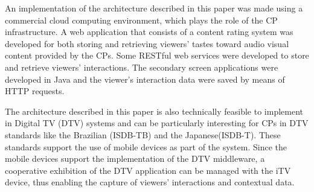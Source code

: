 \documentclass[conference,a4paper]{IEEEtran}
\begin{document}
An implementation of the architecture described in this paper was made using a commercial cloud computing environment, which plays the role of the CP infrastructure. A web application that consists of a content rating system was developed for both storing and retrieving viewers' tastes toward audio visual content provided by the CPs. Some RESTful web services were developed to store and retrieve viewers' interactions. The secondary screen applications were developed in Java and the viewer's interaction data were saved by means of HTTP requests.

The architecture described in this paper is also technically feasible to implement in Digital TV (DTV) systems and can be particularly interesting for CPs in DTV standards like the Brazilian (ISDB-TB) and the Japanese(ISDB-T). These standards support the use of mobile devices as part of the system. Since the mobile devices support the implementation of the DTV middleware, a cooperative exhibition of the DTV application can be managed with the iTV device, thus enabling the capture of viewers' interactions and contextual data.



\end{document}
